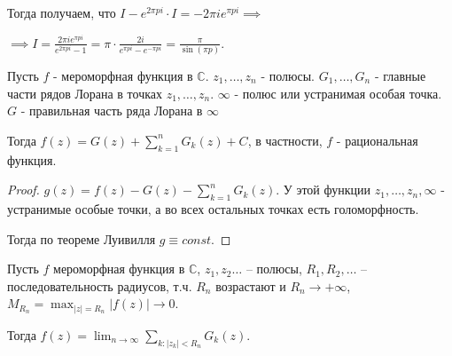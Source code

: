 \begin{example}
\begin{enumerate}
        Тогда получаем, что $I - e^{2 \pi p i} \cdot I = -2 \pi i e^{\pi p i} \implies$

        $\implies I = \frac{2 \pi i e^{\pi p i}}{e^{2 \pi p i} - 1} = \pi \cdot \frac{2 i}{e^{\pi p i} -e^{-\pi p i}} = \frac{\pi}{\sin {(\pi p)}}$.
    \end{enumerate}
\end{example}

\begin{theorem}

    Пусть $f$ - мероморфная функция в $\mathbb{C}$. $z_1, \ldots, z_n$ - полюсы.
    $G_1, \ldots, G_n$ - главные части рядов Лорана в точках $z_1, \ldots, z_n$.
    $\infty$ - полюс или устранимая особая точка. $G$ - правильная часть
    ряда Лорана в $\infty$

    Тогда $f(z) = G(z) + \sum_{k = 1}^n G_k(z) + C$, в частности,
    $f$ - рациональная функция.
\end{theorem}

\begin{proof}
    $g(z) = f(z) - G(z) - \sum_{k = 1}^n G_k(z)$. У этой функции $z_1, \ldots, z_n, \infty$ -
    устранимые особые точки, а во всех остальных точках есть голоморфность.

    Тогда по теореме Луивилля $g \equiv const$.
\end{proof}

\begin{theorem}
    Пусть $f$ мероморфная функция в $\mathbb{C}$, $z_1, z_2 \ldots$ -- полюсы,
    $R_1, R_2, \ldots$ -- последовательность радиусов, т.ч. $R_n$ возрастают и $R_n \rightarrow +\infty$, $M_{R_n} = \max_{|z| = R_n} |f(z)| \rightarrow 0$.

    Тогда $f(z) = \lim_{n \to \infty} \sum_{k:|z_k| < R_n} G_k (z)$.
\end{theorem}

